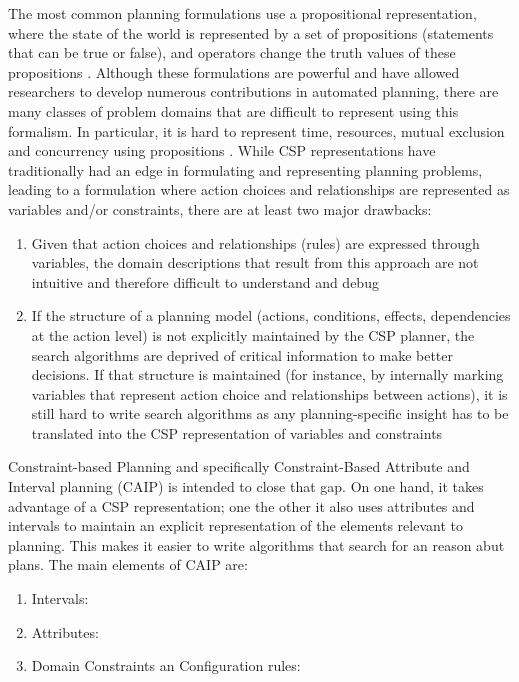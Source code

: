 The most common planning formulations use a propositional
representation, where the state of the world is represented by a set
of propositions (statements that can be true or false), and operators
change the truth values of these propositions \cite{gen87}. Although
these formulations are powerful and have allowed researchers to
develop numerous contributions in automated planning, there are many
classes of problem domains that are difficult to represent using this
formalism. In particular, it is hard to represent time, resources,
mutual exclusion and concurrency using propositions . While CSP representations have traditionally had an edge in
formulating and representing planning problems, 
leading to a formulation where action choices and relationships are
represented as variables and/or constraints, there are at least two
major drawbacks:

\begin{enumerate} 

\item Given that action choices and relationships (rules) are expressed
  through variables, the domain descriptions that result from this
  approach are not intuitive and therefore difficult to understand and
  debug

\item If the structure of a planning model (actions, conditions,
  effects, dependencies at the action level) is not explicitly
  maintained by the CSP planner, the search algorithms are deprived of
  critical information to make better decisions. If that structure is
  maintained (for instance, by internally marking variables that
  represent action choice and relationships between actions), it is
  still hard to write search algorithms as any planning-specific
  insight has to be translated into the CSP representation of
  variables and constraints 

\end{enumerate}

Constraint-based Planning and specifically Constraint-Based Attribute
and Interval planning (CAIP) \cite{mus94,frank2003} is intended to
close that gap. On one hand, it takes advantage of a CSP
representation; one the other it also uses attributes and intervals to
maintain an explicit representation of the elements relevant to
planning. This makes it easier to write algorithms that search for an
reason abut plans. The main elements of CAIP are:

\begin{enumerate}
	\item Intervals: 
	\item Attributes:
	\item Domain Constraints an Configuration rules:
\end{enumerate}



